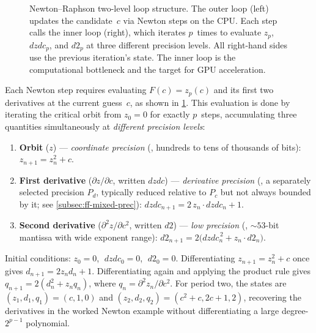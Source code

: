 \begin{figure}[!htbp]
\caption[Newton--Raphson two-level loop structure]{Newton--Raphson two-level loop structure.  The outer loop
  (left) updates the candidate~$c$ via Newton steps on the CPU.  Each
  step calls the inner loop (right), which iterates $p$~times to
  evaluate $z_p$, $\mathit{dzdc}_p$, and $d2_p$ at three different
  precision levels. All right-hand sides use the previous iteration's state.
  The inner loop is the computational bottleneck and
  the target for GPU acceleration.}
\label{fig:newton-loops}
\end{figure}

Each Newton step requires evaluating $F(c) = z_p(c)$ and its first two
derivatives at the current guess~$c$, as shown in \cref{fig:newton-loops}.
This evaluation is done by iterating the
critical orbit from $z_0 = 0$ for exactly $p$~steps, accumulating three
quantities simultaneously at \emph{different precision levels}:

\begin{enumerate}
\item \textbf{Orbit} ($z$) --- \emph{coordinate precision} (,
  hundreds to tens of thousands of bits):
  $z_{n+1} = z_n^2 + c$.
\item \textbf{First derivative} ($\partial z/\partial c$, written
  $\mathit{dzdc}$) --- \emph{derivative precision} (, a
  separately selected precision $P_d$, typically reduced relative to $P_c$
  but not always bounded by it; see \cref{subsec:ff-mixed-prec}):
  $\mathit{dzdc}_{n+1} = 2\,z_n \cdot \mathit{dzdc}_n + 1$.
\item \textbf{Second derivative} ($\partial^2 z/\partial c^2$, written
  $d2$) --- \emph{low precision} (, ${\sim}53$-bit
  mantissa with wide exponent range):
  $d2_{n+1} = 2\bigl(\mathit{dzdc}_n^{\,2} + z_n \cdot d2_n\bigr)$.
\end{enumerate}

\noindent
Initial conditions: $z_0 = 0$, $\;\mathit{dzdc}_0 = 0$, $\;d2_0 = 0$.
Differentiating $z_{n+1}=z_n^2+c$ once gives
$d_{n+1}=2z_nd_n+1$.  Differentiating again and applying the product rule
gives $q_{n+1}=2(d_n^2+z_nq_n)$, where $q_n=\partial^2z_n/\partial c^2$.
For period two, the states are $(z_1,d_1,q_1)=(c,1,0)$ and
$(z_2,d_2,q_2)=(c^2+c,2c+1,2)$, recovering the derivatives in the worked
Newton example without differentiating a large degree-$2^{p-1}$ polynomial.

